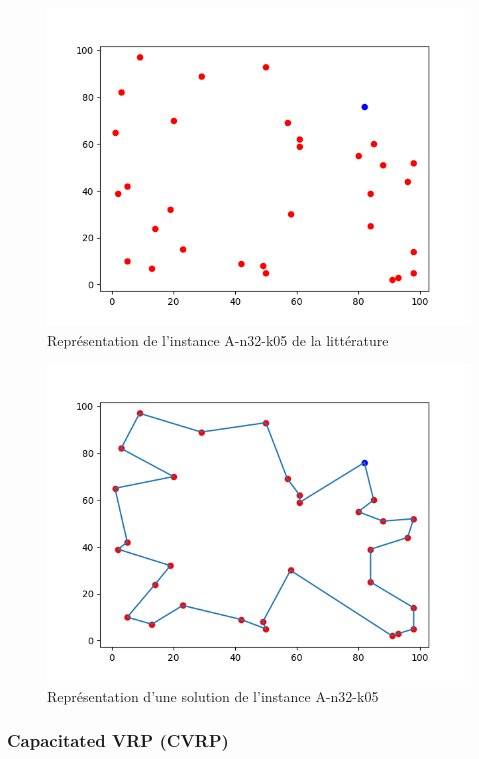 \documentclass[a4paper,11pt]{article}%
\begin{document}
\begin{figure}

\centering
\includegraphics[scale=0.5]{Instance.png}
\caption{Représentation de l'instance A-n32-k05 de la littérature}
\label{Instance3205}
\end{figure}

\begin{figure}

\centering
\includegraphics[scale=0.5]{solutionNoCapacity.png}
\caption{Représentation d'une solution de l'instance A-n32-k05}
\label{SNC3205}
\end{figure}

\subsubsection{Capacitated VRP (CVRP)}
\end{document}
